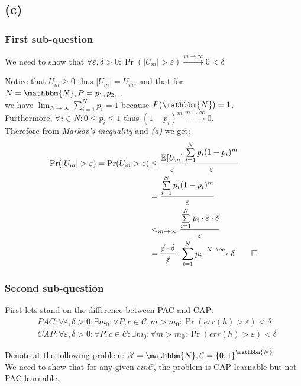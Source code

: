 \documentclass[a4paper]{article}
\newcommand{\lc}{\left\{}
\newcommand{\rc}{\right\}}
\renewcommand{\epsilon}{\varepsilon}
\newcommand{\E}{\mathbb{E}}
\newcommand{\N}{\mathbbm{N}}
\newcommand{\Sum}{\sum\limits_{i=1}^N}
\newcommand{\qedsquare}{\tag*{$\square$}}
\begin{document}
\newpage

\subsection {(c)}

\subsubsection {First sub-question}

We need to show that $ \forall \epsilon , \delta > 0 : \Pr ( |U_m| > \epsilon ) \xrightarrow{m \to \infty} 0 < \delta $

Notice that $ U_m \geq 0 $ thus $ |U_m| = U_m $, and that for $ N=\N , P = { p_1, p_2, .. } $ \\
we have $ \displaystyle \lim_{N \to \infty} \Sum p_i = 1 $ because $ P(\N) = 1 $. \\
Furthermore, $ \forall i \in N : 0 \leq p_i \leq 1 $ thus $ (1-p_i)^m \xrightarrow{m \to \infty} 0 $. \\
Therefore from \textit{Markov's inequality} and \textit{(a)} we get:
\begin{align*}
    \Pr ( |U_m| > \epsilon ) = \Pr ( U_m > \epsilon ) &\leq \frac{\E[U_m]}{\epsilon} \frac{ \Sum p_i ( 1 - p_i ) ^m }{\epsilon} \\
    &= \frac{ \Sum p_i ( 1 - p_i ) ^m }{\epsilon} \\
    &<_{m \to \infty} \frac{ \Sum p_i \cdot \epsilon \cdot \delta }{\epsilon} \\
    &= \frac{ \cancel{\epsilon} \cdot \delta }{\cancel{\epsilon}} \cdot \Sum p_i \xrightarrow{N \to \infty} \delta
    \qedsquare
\end{align*}

\subsubsection {Second sub-question}

First lets stand on the difference between PAC and CAP:
\begin{align*}
    &PAC: \forall \epsilon , \delta > 0 : \exists m_0 : \forall P, c\in\mathcal{C}, m>m_0 : \Pr( err(h) > \epsilon ) <\delta \\
    &CAP: \forall \epsilon , \delta > 0 : \forall P, c\in\mathcal{C} : \exists m_0 :\forall m>m_0 : \Pr( err(h) > \epsilon ) <\delta
\end{align*}

Denote at the following problem: $ \mathcal{X}=\N, \mathcal{C}= \lc 0,1 \rc^{\N} $ \\
We need to show that for any given $ c in \mathcal{C} $, the problem is CAP-learnable but not PAC-learnable.
\end{document}
